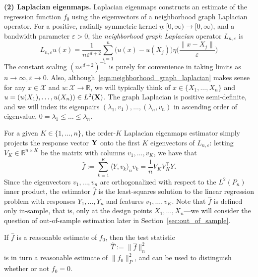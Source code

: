 \documentclass{article}
\newcommand{\Reals}{\mathbb{R}}
\newcommand{\1}{\mathbf{1}}
\newcommand{\Leb}{L}
\newcommand{\mc}[1]{\mathcal{#1}}
\newcommand{\dotp}[2]{\langle #1, #2 \rangle}
\newcommand{\wh}[1]{\widehat{#1}}
\theoremstyle{alden}
\theoremstyle{aldenthm}
\theoremstyle{definition}
\theoremstyle{remark}
\begin{document}
\textbf{(2) Laplacian eigenmaps.} Laplacian eigenmaps constructs an estimate of the regression function $f_0$ using the eigenvectors of a neighborhood graph Laplacian operator. For a positive, radially symmetric kernel $\eta: [0,\infty) \to [0,\infty)$, and a bandwidth parameter $\varepsilon > 0$, the \emph{neighborhood graph Laplacian} operator $L_{n,\varepsilon}$ is
\begin{equation}
\label{eqn:neighborhood_graph_laplacian}
L_{n,\varepsilon}u(x) = \frac{1}{n\varepsilon^{d + 2}} \sum_{i = 1}^{n} \bigl(u(x) - u(X_j)\bigr) \eta\biggl(\frac{\|x - X_j\|}{\varepsilon}\biggr)
\end{equation}
The constant scaling $(n\varepsilon^{d + 2})^{-1}$ is purely for convenience in taking limits as $n \to \infty, \varepsilon \to 0$. Also, although~\eqref{eqn:neighborhood_graph_laplacian} makes sense for any $x \in \mc{X}$ and $u: \mc{X} \to \Reals$, we will typically think of $x \in \{X_1,\ldots,X_n\}$ and $u = (u(X_1),\ldots,u(X_n)) \in \Leb^2({\bf X})$. The graph Laplacian is positive semi-definite, and we will index its eigenpairs $(\lambda_1,v_1),\ldots,(\lambda_n,v_n)$ in ascending order of eigenvalue, $0 = \lambda_1 \leq \ldots \leq \lambda_n$. 

For a given $K \in \{1,\ldots,n\}$, the order-$K$ Laplacian eigenmaps estimator simply projects the response vector ${\bf Y}$ onto the first $K$ eigenvectors of $L_{n,\varepsilon}$: letting $V_K \in \Reals^{n \times K}$ be the matrix with columns $v_1,\ldots,v_K$, we have that
\begin{equation}
\label{eqn:laplacian_eigenmaps_estimator}
\wh{f} := \sum_{k = 1}^{K} \dotp{Y}{v_k}_{n} v_k = \frac{1}{n} V_K V_K^{\top} Y.
\end{equation} 
Since the eigenvectors $v_1,\ldots,v_n$ are orthogonalized with respect to the $L^2(P_n)$ inner product, the estimator $\wh{f}$ is the least-squares solution to the linear regression problem with responses $Y_1,\ldots,Y_n$ and features $v_1,\ldots,v_K$. Note that $\wh{f}$ is defined only in-sample, that is, only at the design points $X_1,\ldots,X_n$---we will consider the question of out-of-sample estimation later in Section~\ref{sec:out_of_sample}. 

If $\wh{f}$ is a reasonable estimate of $f_0$, then the test statistic
\begin{equation}
\label{eqn:laplacian_eigenmaps_test}
\wh{T} := \|\wh{f}\|_n^2
\end{equation}
is in turn a reasonable estimate of $\|f_0\|_{P}^2$, and can be used to distinguish whether or not $f_0 = 0$.
\end{document}
